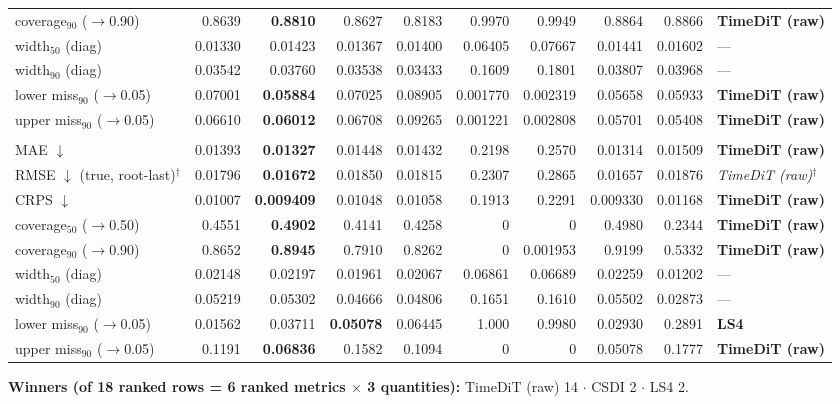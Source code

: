 \documentclass[11pt,a4paper]{article}
\begin{document}
\begin{landscape}
\begin{center}
\begin{tabular}{lrrrrrrrrl}
coverage$_{90}$ ($\to$0.90) & 0.8639 & \textbf{0.8810} & 0.8627 & 0.8183 & 0.9970 & 0.9949 & 0.8864 & 0.8866 & \textbf{TimeDiT (raw)} \\
width$_{50}$ (diag) & 0.01330 & 0.01423 & 0.01367 & 0.01400 & 0.06405 & 0.07667 & 0.01441 & 0.01602 & --- \\
width$_{90}$ (diag) & 0.03542 & 0.03760 & 0.03538 & 0.03433 & 0.1609 & 0.1801 & 0.03807 & 0.03968 & --- \\
lower miss$_{90}$ ($\to$0.05) & 0.07001 & \textbf{0.05884} & 0.07025 & 0.08905 & 0.001770 & 0.002319 & 0.05658 & 0.05933 & \textbf{TimeDiT (raw)} \\
upper miss$_{90}$ ($\to$0.05) & 0.06610 & \textbf{0.06012} & 0.06708 & 0.09265 & 0.001221 & 0.002808 & 0.05701 & 0.05408 & \textbf{TimeDiT (raw)} \\
\addlinespace
\multicolumn{10}{l}{\textbf{rv ($M$ scalar)}} \\
MAE $\downarrow$ & 0.01393 & \textbf{0.01327} & 0.01448 & 0.01432 & 0.2198 & 0.2570 & 0.01314 & 0.01509 & \textbf{TimeDiT (raw)} \\
RMSE $\downarrow$ (true, root-last)$^{\dagger}$ & 0.01796 & \textbf{0.01672} & 0.01850 & 0.01815 & 0.2307 & 0.2865 & 0.01657 & 0.01876 & \textit{TimeDiT (raw)}$^{\dagger}$ \\
CRPS $\downarrow$ & 0.01007 & \textbf{0.009409} & 0.01048 & 0.01058 & 0.1913 & 0.2291 & 0.009330 & 0.01168 & \textbf{TimeDiT (raw)} \\
coverage$_{50}$ ($\to$0.50) & 0.4551 & \textbf{0.4902} & 0.4141 & 0.4258 & 0 & 0 & 0.4980 & 0.2344 & \textbf{TimeDiT (raw)} \\
coverage$_{90}$ ($\to$0.90) & 0.8652 & \textbf{0.8945} & 0.7910 & 0.8262 & 0 & 0.001953 & 0.9199 & 0.5332 & \textbf{TimeDiT (raw)} \\
width$_{50}$ (diag) & 0.02148 & 0.02197 & 0.01961 & 0.02067 & 0.06861 & 0.06689 & 0.02259 & 0.01202 & --- \\
width$_{90}$ (diag) & 0.05219 & 0.05302 & 0.04666 & 0.04806 & 0.1651 & 0.1610 & 0.05502 & 0.02873 & --- \\
lower miss$_{90}$ ($\to$0.05) & 0.01562 & 0.03711 & \textbf{0.05078} & 0.06445 & 1.000 & 0.9980 & 0.02930 & 0.2891 & \textbf{LS4} \\
upper miss$_{90}$ ($\to$0.05) & 0.1191 & \textbf{0.06836} & 0.1582 & 0.1094 & 0 & 0 & 0.05078 & 0.1777 & \textbf{TimeDiT (raw)} \\
\bottomrule
\end{tabular}
\end{center}
\noindent\textbf{Winners (of 18 ranked rows = 6 ranked metrics $\times$ 3 quantities):} TimeDiT (raw) 14 $\cdot$ CSDI 2 $\cdot$ LS4 2.
\end{landscape}
\end{document}
